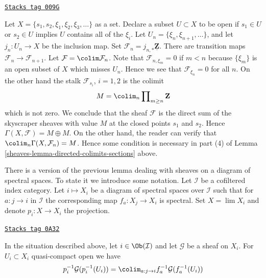 \begin{example}
\label{sheaves-example-conditions-needed-colimit}
\href{https://stacks.math.columbia.edu/tag/009G}{\texttt{Stacks tag 009G}}

Let $X = \{s_1, s_2, \xi_1, \xi_2, \xi_3, \ldots\}$ as a set.
Declare a subset $U \subset X$ to be open
if $s_1 \in U$ or $s_2 \in U$ implies $U$ contains all of the
$\xi_i$. Let $U_n = \{\xi_n, \xi_{n + 1}, \ldots\}$, and
let $j_n : U_n \to X$ be the inclusion map.
Set $\mathcal{F}_n = j_{n, *}\underline{\mathbf{Z}}$.
There are transition maps $\mathcal{F}_n \to \mathcal{F}_{n + 1}$.
Let $\mathcal{F} = \colim \mathcal{F}_n$.
Note that $\mathcal{F}_{n, \xi_m} = 0$ if $m < n$
because $\{\xi_m\}$ is an open subset of $X$ which misses $U_n$.
Hence we see that $\mathcal{F}_{\xi_n} = 0$ for all $n$.
On the other hand the stalk $\mathcal{F}_{s_i}$, $i = 1, 2$
is the colimit
$$
M = \colim_n \prod\nolimits_{m \geq n} \mathbf{Z}
$$
which is not zero. We conclude that the sheaf
$\mathcal{F}$ is the direct sum of the
skyscraper sheaves with value $M$ at the closed points
$s_1$ and $s_2$. Hence $\Gamma(X, \mathcal{F}) = M \oplus M$.
On the other hand, the reader can verify that
$\colim_n \Gamma(X, \mathcal{F}_n) = M$.
Hence some condition is necessary in part (4)
of Lemma \ref{sheaves-lemma-directed-colimits-sections} above.
\end{example}

There is a version of the previous lemma dealing with sheaves on a diagram
of spectral spaces. To state it we introduce some notation.
Let $\mathcal{I}$ be a cofiltered index category.
Let $i \mapsto X_i$ be a diagram of spectral spaces over $\mathcal{I}$
such that for $a : j \to i$ in $\mathcal{I}$ the corresponding map
$f_a : X_j \to X_i$ is spectral. Set $X = \lim X_i$ and denote
$p_i : X \to X_i$ the projection.

\begin{lemma}
\label{sheaves-lemma-compute-pullback-to-limit}
\href{https://stacks.math.columbia.edu/tag/0A32}{\texttt{Stacks tag 0A32}}

In the situation described above, let $i \in \Ob(\mathcal{I})$ and let
$\mathcal{G}$ be a sheaf on $X_i$. For $U_i \subset X_i$
quasi-compact open we have
$$
p_i^{-1}\mathcal{G}(p_i^{-1}(U_i)) =
\colim_{a : j \to i} f_a^{-1}\mathcal{G}(f_a^{-1}(U_i))
$$
\end{lemma}

